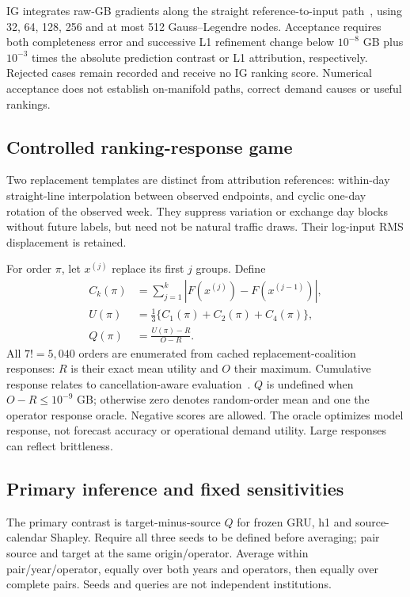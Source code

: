 \documentclass[conference]{IEEEtran}
\begin{document}
IG integrates raw-GB gradients along the straight reference-to-input path~\cite{ig}, using 32, 64, 128, 256 and at most 512 Gauss--Legendre nodes. Acceptance requires both completeness error and successive L1 refinement change below $10^{-8}$ GB plus $10^{-3}$ times the absolute prediction contrast or L1 attribution, respectively. Rejected cases remain recorded and receive no IG ranking score. Numerical acceptance does not establish on-manifold paths, correct demand causes or useful rankings.





\subsection{Controlled ranking-response game}
Two replacement templates are distinct from attribution references: within-day straight-line interpolation between observed endpoints, and cyclic one-day rotation of the observed week. They suppress variation or exchange day blocks without future labels, but need not be natural traffic draws. Their log-input RMS displacement is retained.

For order $\pi$, let $x^{(j)}$ replace its first $j$ groups. Define
\begin{align}
C_k(\pi)&=\sum_{j=1}^{k}|F(x^{(j)})-F(x^{(j-1)})|,\\
U(\pi)&=\tfrac13\{C_1(\pi)+C_2(\pi)+C_4(\pi)\},\\
Q(\pi)&=\frac{U(\pi)-R}{O-R}.
\end{align}
All $7!=5,040$ orders are enumerated from cached replacement-coalition responses: $R$ is their exact mean utility and $O$ their maximum. Cumulative response relates to cancellation-aware evaluation~\cite{timing}. $Q$ is undefined when $O-R\leq10^{-9}$ GB; otherwise zero denotes random-order mean and one the operator response oracle. Negative scores are allowed. The oracle optimizes model response, not forecast accuracy or operational demand utility. Large responses can reflect brittleness.

\subsection{Primary inference and fixed sensitivities}
The primary contrast is target-minus-source $Q$ for frozen GRU, h1 and source-calendar Shapley. Require all three seeds to be defined before averaging; pair source and target at the same origin/operator. Average within pair/year/operator, equally over both years and operators, then equally over complete pairs. Seeds and queries are not independent institutions.
\end{document}
